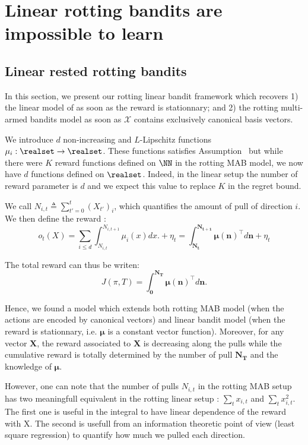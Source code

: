 
\section{Linear rotting bandits are impossible to learn}



\subsection{Linear rested rotting bandits}
In this section, we present our rotting linear bandit framework which recovers 1) the linear model of %
 as soon as the reward is stationnary; and 2) the rotting multi-armed bandits model as soon as $\mathcal{X}$ contains exclusively canonical basis vectors. 

We introduce $d$ non-increasing and $L$-Lipschitz functions $\mu_i : \realset \rightarrow \realset$. These functions satisfies Assumption~ %
 but while there were $K$ reward functions defined on $\NN$ in the rotting MAB model, we now have $d$ functions defined on $\realset$. Indeed, in the linear setup the number of reward parameter is $d$ and we expect this value to replace $K$ in the regret bound.

We call $N_{i,t} \triangleq \sum_{t'=0}^t (X_{t'})_i$, which quantifies the amount of pull of direction $i$. We then define the reward : 
\[
o_t(X) = \sum_{i\leq d} \int_{N_{i,t}}^{N_{i,t+1}} \mu_i(x)dx. +\eta_t 
 = \int_{\bm{N_{t}}}^{\bm{N_{t+1}}} \bm{\mu}(\bm{n})^\intercal  d\bm{n} + \eta_t\]

The total reward can thus be writen:  
\[ J(\pi, T) = \int_{\bm{0}}^{\bm{N_{T}}} \bm{\mu}(\bm{n})^\intercal d\bm{n} .\]

Hence, we found a model which extends both rotting MAB model (when the actions are encoded by canonical vectors) and linear bandit model (when the reward is stationnary, i.e. $\bm{\mu}$ is a constant vector function). Moreover, for any vector $\bm{X}$, the reward associated to $\bm{X}$ is decreasing along the pulls while the cumulative reward is totally determined by the number of pull $\bm{N_T}$ and the knowledge of $\bm{\mu}$.

However, one can note that the number of pulls $N_{i,t}$ in the rotting MAB setup has two meaningfull equivalent in the rotting linear setup : $\sum_t x_{i,t}$ and $\sum_t x_{i,t}^2$. The first one is useful in the integral to have linear dependence of the reward with X. The second is usefull from an information theoretic point of view (least square regression) to quantify how much we pulled each direction.

